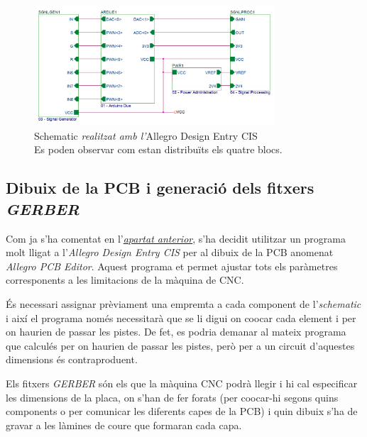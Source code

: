 \begin{figure}[htp]
	\centering
	\includegraphics[width=0.8\textwidth]{Figures/schematic.png}
	\caption[\textit{Schematic} realitzat amb l'\textit{Allegro Design Entry CIS}]{Schematic\textit{ realitzat amb l'}Allegro Design Entry CIS\\{\footnotesize Es poden observar com estan distribuïts els quatre blocs.}}
	\label{fig:schematic}
\end{figure}

\subsection{Dibuix de la \acs{PCB} i generació dels fitxers \textit{GERBER}}\label{subsec:gerbers}

Com ja s'ha comentat en l'\hyperref[subsec:schematic]{\textit{apartat anterior}}, s'ha decidit utilitzar un programa molt lligat a l'\textit{Allegro Design Entry CIS} per al dibuix de la \ac{PCB} anomenat \textit{Allegro \ac{PCB} Editor}. Aquest programa et permet ajustar tots els paràmetres corresponents a les limitacions de la màquina de \ac{CNC}.

És necessari assignar prèviament una empremta a cada component de l'\textit{schematic} i així el programa només necessitarà que se li digui on co\lgem ocar cada element i per on haurien de passar les pistes. De fet, es podria demanar al mateix programa que calculés per on haurien de passar les pistes, però per a un circuit d'aquestes dimensions és contraproduent.

Els fitxers \textit{GERBER} són els que la màquina \ac{CNC} podrà llegir i hi cal especificar les dimensions de la placa, on s'han de fer forats (per co\lgem ocar-hi segons quins components o per comunicar les diferents capes de la \ac{PCB}) i quin dibuix s'ha de gravar a les làmines de coure que formaran cada capa.

%	
%	
%	
%	


